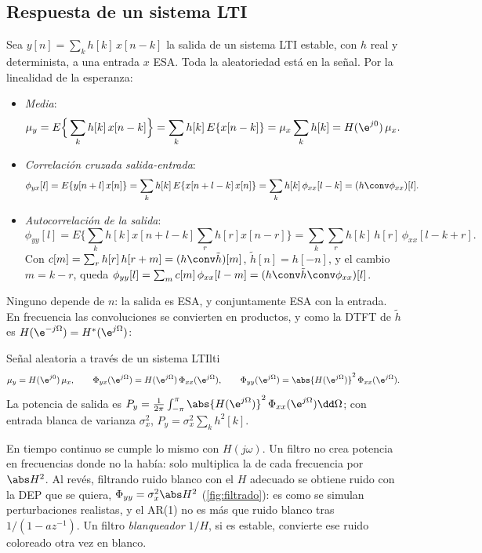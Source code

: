 \documentclass[11pt,a4paper]{scrartcl}
\begin{document}
\subsection{Respuesta de un sistema LTI}

Sea $y[n]=\sum_kh[k]\,x[n-k]$ la salida de un sistema LTI estable, con $h$ real y determinista, a una entrada $x$ ESA. Toda la aleatoriedad está en la señal. Por la linealidad de la esperanza:

\begin{itemize}
  \item \emph{Media}:
  \[
    \mu_y=E\Big\{\sum_kh[k]\,x[n-k]\Big\}=\sum_kh[k]\,E\{x[n-k]\}=\mu_x\sum_kh[k]=H(\e^{j0})\,\mu_x .
  \]
  \item \emph{Correlación cruzada salida-entrada}:
  \[
    \phi_{yx}[l]=E\{y[n+l]\,x[n]\}=\sum_kh[k]\,E\{x[n+l-k]\,x[n]\}=\sum_kh[k]\,\phi_{xx}[l-k]=(h\conv\phi_{xx})[l].
  \]
  \item \emph{Autocorrelación de la salida}:
  \[
    \phi_{yy}[l]=E\Big\{\sum_kh[k]x[n+l-k]\sum_rh[r]x[n-r]\Big\}=\sum_k\sum_rh[k]\,h[r]\,\phi_{xx}[l-k+r].
  \]
  Con $c[m]=\sum_rh[r]\,h[r+m]=(h\conv\tilde h)[m]$, $\tilde h[n]=h[-n]$, y el cambio $m=k-r$, queda $\phi_{yy}[l]=\sum_mc[m]\,\phi_{xx}[l-m]=(h\conv\tilde h\conv\phi_{xx})[l]$.
\end{itemize}

Ninguno depende de $n$: la salida es ESA, y conjuntamente ESA con la entrada. En frecuencia las convoluciones se convierten en productos, y como la DTFT de $\tilde h$ es $H(\e^{-j\Omega})=H^*(\e^{j\Omega})$:

\begin{propiedad}{Señal aleatoria a través de un sistema LTI}{lti}
  \[
    \mu_y=H(\e^{j0})\,\mu_x,\qquad
    \Phi_{yx}(\e^{j\Omega})=H(\e^{j\Omega})\,\Phi_{xx}(\e^{j\Omega}),\qquad
    \Phi_{yy}(\e^{j\Omega})=\abs{H(\e^{j\Omega})}^2\,\Phi_{xx}(\e^{j\Omega}).
  \]
  La potencia de salida es $P_y=\frac1{2\pi}\int_{-\pi}^{\pi}\abs{H(\e^{j\Omega})}^2\,\Phi_{xx}(\e^{j\Omega})\dd\Omega$; con entrada blanca de varianza $\sigma_x^2$, $P_y=\sigma_x^2\sum_kh^2[k]$.
\end{propiedad}

En tiempo continuo se cumple lo mismo con $H(j\omega)$. Un filtro no crea potencia en frecuencias donde no la había: solo multiplica la de cada frecuencia por $\abs H^2$. Al revés, filtrando ruido blanco con el $H$ adecuado se obtiene ruido con la DEP que se quiera, $\Phi_{yy}=\sigma_x^2\abs H^2$ (\cref{fig:filtrado}): es como se simulan perturbaciones realistas, y el AR(1) no es más que ruido blanco tras $1/(1-az^{-1})$. Un filtro \emph{blanqueador} $1/H$, si es estable, convierte ese ruido coloreado otra vez en blanco.
\end{document}
